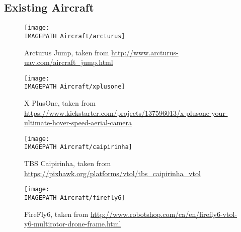 \subsection*{Existing Aircraft}
\begin{figure}[!ht]
	\centering
	\texttt{[image: \\IMAGEPATH Aircraft/arcturus]}
	\caption{Arcturus Jump, taken from \url{http://www.arcturus-uav.com/aircraft_jump.html}}
	\label{fig:arcturus}
\end{figure}

\begin{figure}[!ht]
	\centering
	\texttt{[image: \\IMAGEPATH Aircraft/xplusone]}
	\caption[caption]{X PlusOne, taken from\\ \url{https://www.kickstarter.com/projects/137596013/x-plusone-your-ultimate-hover-speed-aerial-camera}}
	\label{fig:xplusone}
\end{figure}

\begin{figure}[!ht]
	\centering
	\texttt{[image: \\IMAGEPATH Aircraft/caipirinha]}
	\caption{TBS Caipirinha, taken from \url{https://pixhawk.org/platforms/vtol/tbs_caipirinha_vtol}}
	\label{fig:caipirinha}
\end{figure}

\begin{figure}[!ht]
	\centering
	\texttt{[image: \\IMAGEPATH Aircraft/firefly6]}
	\caption{FireFly6, taken from \url{http://www.robotshop.com/ca/en/firefly6-vtol-y6-multirotor-drone-frame.html}}
	\label{fig:firefly}
\end{figure}

